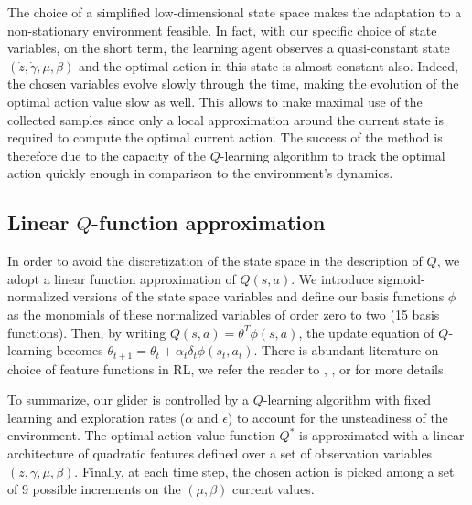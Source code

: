 \documentclass{jfpda}
\begin{document}
The choice of a simplified low-dimensional state space makes the adaptation to a non-stationary environment feasible. In fact, with our specific choice of state variables, on the short term, the learning agent observes a quasi-constant state $(\dot{z},\dot{\gamma}, \mu,\beta)$ and the optimal action in this state is almost constant also. Indeed, the chosen variables evolve slowly through the time, making the evolution of the optimal action value slow as well. This allows to make maximal use	of the collected samples since only a local approximation around the current state is required to compute the optimal current action. The success of the method is therefore due to the capacity of the $Q$-learning algorithm to track the optimal action quickly enough in comparison to the environment's dynamics.

\subsection{Linear $Q$-function approximation}

In order to avoid the discretization of the state space in the description of $Q$, we adopt a linear function approximation of $Q(s,a)$. We introduce sigmoid-normalized versions of the state space variables and define our basis functions $\phi$ as the monomials of these normalized variables of order zero to two (15 basis functions). Then, by writing $Q(s,a)=\theta^T \phi(s,a)$, the update equation of $Q$-learning becomes $\theta_{t+1}=\theta_t + \alpha_t\delta_t\phi(s_t,a_t)$. 
There is abundant literature on choice of feature functions in RL, we refer the reader to \cite{parr08}, \cite{hachiya10}, or \cite{nguyen13} for more details.


To summarize, our glider is controlled by a $Q$-learning algorithm with fixed learning and exploration rates ($\alpha$ and $\epsilon$) to account for the unsteadiness of the environment. The optimal action-value function $Q^{*}$ is approximated with a linear architecture of quadratic features defined over a set of observation variables $\left(\dot{z}, \dot{\gamma}, \mu, \beta \right)$. Finally, at each time step, the chosen action is picked among a set of 9 possible increments on the $\left(\mu, \beta\right)$ current values.
\end{document}
